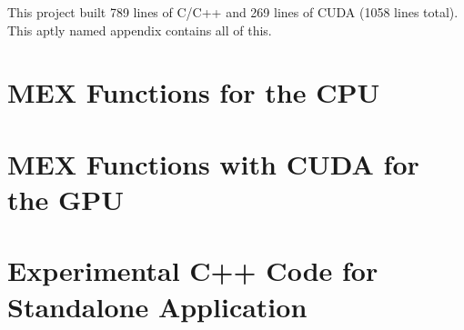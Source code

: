 This project built 789 lines of C/C++ and 269 lines of CUDA (1058 lines total). This aptly named appendix contains all of this.

\label{app:c_cpp_code}
\lstset{language=C++, style=C++}

\section{MEX Functions for the CPU}
\label{appC:MEX_cpu}



\section{MEX Functions with CUDA for the GPU}
\label{appC:MEX_CUDA}


\newcommand{\originalcpath}{C:/Users/cason/OneDrive/Documents/PSU/Project/03_C++/}

\section{Experimental C++ Code for Standalone Application}
\label{appC:Standalone_CPP}





